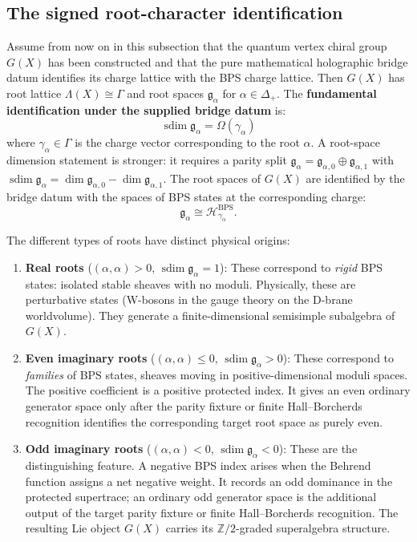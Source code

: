 \documentclass[11pt]{article}
\theoremstyle{definition}
\newcommand{\sdim}{\operatorname{sdim}}
\newcommand{\bZ}{\mathbb{Z}}
\begin{document}
\subsection{The signed root-character identification}

Assume from now on in this subsection that the quantum vertex chiral
group $G(X)$ has been constructed and that the pure mathematical
holographic bridge datum identifies its charge lattice with the BPS
charge lattice. Then $G(X)$ has root lattice $\Lambda(X)\cong\Gamma$
and root spaces $\mathfrak{g}_\alpha$ for $\alpha\in\Delta_+$. The
\textbf{fundamental identification under the supplied bridge datum} is:
\begin{equation}
\label{eq:root-mult-bps}
 \boxed{\sdim\mathfrak g_\alpha = \Omega(\gamma_\alpha)}
\end{equation}
where $\gamma_\alpha \in \Gamma$ is the charge vector corresponding
to the root $\alpha$. A root-space dimension statement is stronger: it
requires a parity split
\(\mathfrak g_\alpha=\mathfrak g_{\alpha,0}\oplus\mathfrak g_{\alpha,1}\)
with
\(\sdim\mathfrak g_\alpha
=\dim\mathfrak g_{\alpha,0}-\dim\mathfrak g_{\alpha,1}\).
The root spaces of $G(X)$ are identified by the bridge datum with the
spaces of BPS states at the corresponding charge:
\[
 \mathfrak{g}_\alpha \cong \mathcal{H}_{\gamma_\alpha}^{\mathrm{BPS}}.
\]

The different types of roots have distinct physical origins:
\begin{enumerate}[label=(\alph*)]
 \item \textbf{Real roots} ($(\alpha,\alpha) > 0$, \(\sdim\mathfrak g_\alpha=1\)):
 These correspond to \emph{rigid} BPS states: isolated stable
 sheaves with no moduli. Physically, these are perturbative
 states (W-bosons in the gauge theory on the D-brane worldvolume).
 They generate a finite-dimensional semisimple subalgebra of
 $G(X)$.

 \item \textbf{Even imaginary roots} ($(\alpha,\alpha) \leq 0$,
 $\operatorname{sdim}\mathfrak g_\alpha > 0$): These correspond to
 \emph{families} of BPS states, sheaves moving in positive-dimensional
 moduli spaces. The positive coefficient is a positive protected
 index. It gives an even ordinary generator space only after the
 parity fixture or finite Hall--Borcherds recognition identifies the
 corresponding target root space as purely even.

 \item \textbf{Odd imaginary roots} ($(\alpha,\alpha) < 0$,
 $\operatorname{sdim}\mathfrak g_\alpha < 0$): These are the
 distinguishing feature. A negative BPS index arises when the
 Behrend function assigns a net negative weight. It records an odd
 dominance in the protected supertrace; an ordinary odd generator
 space is the additional output of the target parity fixture or finite
 Hall--Borcherds recognition. The resulting Lie object $G(X)$ carries
 its $\bZ/2$-graded superalgebra structure.
\end{enumerate}
\end{document}
